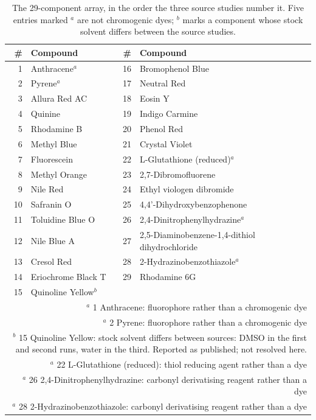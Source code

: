 \begin{table}[htb]
\centering
\caption{The 29-component array, in the order the three source studies number it. Five entries marked $^{a}$ are not chromogenic dyes; $^{b}$ marks a component whose stock solvent differs between the source studies.}
\label{tab:dyepanel}
\small
\begin{tabular}{rlrl}
\hline
\# & Compound & \# & Compound \\
\hline
1 & Anthracene$^{a}$ & 16 & Bromophenol Blue \\
2 & Pyrene$^{a}$ & 17 & Neutral Red \\
3 & Allura Red AC & 18 & Eosin Y \\
4 & Quinine & 19 & Indigo Carmine \\
5 & Rhodamine B & 20 & Phenol Red \\
6 & Methyl Blue & 21 & Crystal Violet \\
7 & Fluorescein & 22 & L-Glutathione (reduced)$^{a}$ \\
8 & Methyl Orange & 23 & 2,7-Dibromofluorene \\
9 & Nile Red & 24 & Ethyl viologen dibromide \\
10 & Safranin O & 25 & 4,4'-Dihydroxybenzophenone \\
11 & Toluidine Blue O & 26 & 2,4-Dinitrophenylhydrazine$^{a}$ \\
12 & Nile Blue A & 27 & 2,5-Diaminobenzene-1,4-dithiol dihydrochloride \\
13 & Cresol Red & 28 & 2-Hydrazinobenzothiazole$^{a}$ \\
14 & Eriochrome Black T & 29 & Rhodamine 6G \\
15 & Quinoline Yellow$^{b}$ &  &  \\
\hline
\multicolumn{4}{p{13cm}}{\footnotesize $^{a}$ 1 Anthracene: fluorophore rather than a chromogenic dye}\\
\multicolumn{4}{p{13cm}}{\footnotesize $^{a}$ 2 Pyrene: fluorophore rather than a chromogenic dye}\\
\multicolumn{4}{p{13cm}}{\footnotesize $^{b}$ 15 Quinoline Yellow: stock solvent differs between sources: DMSO in the first and second runs, water in the third. Reported as published; not resolved here.}\\
\multicolumn{4}{p{13cm}}{\footnotesize $^{a}$ 22 L-Glutathione (reduced): thiol reducing agent rather than a dye}\\
\multicolumn{4}{p{13cm}}{\footnotesize $^{a}$ 26 2,4-Dinitrophenylhydrazine: carbonyl derivatising reagent rather than a dye}\\
\multicolumn{4}{p{13cm}}{\footnotesize $^{a}$ 28 2-Hydrazinobenzothiazole: carbonyl derivatising reagent rather than a dye}\\
\end{tabular}
\end{table}
